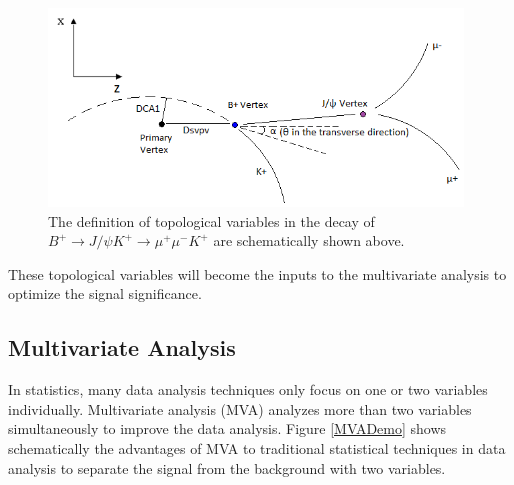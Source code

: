 \begin{figure}[h]
\begin{center}
\includegraphics[width= 0.98\textwidth]{Figures/Chapter5/BPDecay.png}
\caption{The definition of topological variables in the decay of $B^+ \rightarrow J/\psi K^+ \rightarrow \mu^+\mu^- K^+ $ are schematically shown above.}
\label{DecayTopoBP}
\end{center}
\end{figure}

These topological variables will become the inputs to the multivariate analysis to optimize the signal significance.

\subsection{Multivariate Analysis}

In statistics, many data analysis techniques only focus on one or two variables individually. Multivariate analysis (MVA) analyzes more than two variables simultaneously to improve the data analysis. Figure \ref{MVADemo} shows schematically the advantages of MVA to traditional statistical techniques in data analysis to separate the signal from the background with two variables. 




